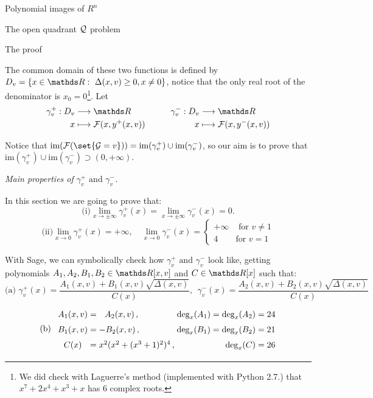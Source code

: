 \documentclass[11pt, a4paper, english, twoside, notitlepage]{report}
\begin{document}
\begin{chapter}{Polynomial images of $R^n$}
\begin{section}{The open quadrant $\mathcal{Q}$ problem}
\begin{subsection}{The proof}
\begin{Proof}
			The common domain of these two functions is defined by $D_v=\{x \in \R :\ \Delta(x,v) \geq 0, x \neq 0\}$, notice that the only real root of the denominator is $x_0 = 0$\footnote{We did check with Laguerre's method (implemented with Python 2.7.) that $x^7 + 2x^4 + x^3 + x$ has 6 complex roots.}. Let
			$$\begin{matrix}
				\begin{aligned}
					\gamma_v^+: D_v & \longrightarrow \R\\
					x &\longmapsto \F(x,y^+(x,v))\\
					\end{aligned}
 				& \qquad
				\begin{aligned}
					\gamma_v^-:D_v & \longrightarrow \R\\
					x &\longmapsto \F(x,y^-(x,v))\\
				\end{aligned}
			\end{matrix}$$
			
			Notice that $\text{im}(\F(\set{\G = v})) = \text{im}(\gamma_v^+) \cup \text{im}(\gamma_v^-)$, so our aim is to prove that $\text{im}(\gamma_v^+) \cup \text{im}(\gamma_v^-) \supset (0, +\infty)$.
			
			\begin{center}
				 \emph{Main properties of $\gamma_v^+ \text{ and } \gamma_v^-$.}
			\end{center}\label{step2}
			
			In this section we are going to prove that:
			$$\text{(i)} \lim_{x\rightarrow \pm\infty}\gamma_v^+(x)=\lim_{x\rightarrow \pm\infty}\gamma_v^-(x)=0.$$
			$$\text{(ii)} \lim_{x\rightarrow 0}\gamma_v^+(x)=+\infty
				,\quad 
				\lim_{x\rightarrow 0}\gamma_v^-(x) =
				\left\{\begin{array}{ll}
					+\infty & \text{ for $v\neq 1$}\\
					4 & \text{for $v=1$}
				\end{array} \right.
			$$

			With Sage, we can symbolically check how $\gamma_v^+ \text{ and } \gamma_v^-$ look like, getting polynomials $A_1,A_2,B_1,B_2\in\R[x,v]$ and $C\in \R[x]$ such that:
			$$\text{(a) } \gamma_v^+(x)=\dfrac{A_1(x,v)+B_1(x,v)\sqrt{\Delta(x,v)}}{C(x)}, \ \ 
			\gamma_v^-(x)=\dfrac{A_2(x,v)+B_2(x,v)\sqrt{\Delta(x,v)}}{C(x)}$$
			$$\text{(b)}\ \ 
				\arraycolsep=1.4pt\def\arraystretch{1.5}
				\begin{array}{cclr}
					A_1(x, v) & = &\ \ A_2(x, v)\, , & \text{deg}_x(A_1) = \text{deg}_x(A_2) = 24\\
					B_1(x, v) & = & - B_2(x, v)\, , & \text{deg}_x(B_1) = \text{deg}_x(B_2) = 21\\
					C(x) & = & x^2(x^2+(x^3+1)^2)^4\, , & \text{deg}_x(C) = 26
				\end{array}
			$$
			

\end{Proof}
\end{subsection}
\end{section}
\end{chapter}
\end{document}
